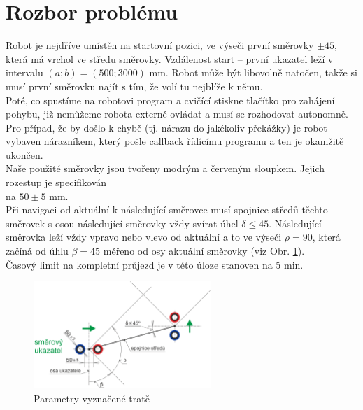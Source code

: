 \documentclass{article}
\begin{document}
\section{Rozbor problému}
Robot je nejdříve umístěn na startovní pozici, ve výseči první směrovky $\pm 45$\degree{}, která má vrchol ve středu směrovky. Vzdálenost start – první ukazatel leží v intervalu $(a; b) = (500; 3000)$ mm. Robot může být libovolně natočen, takže si musí první směrovku najít s tím, že volí tu nejblíže k němu.\\
Poté, co spustíme na robotovi program a cvičící stiskne tlačítko pro zahájení pohybu, již nemůžeme robota externě ovládat a musí se rozhodovat autonomně.\\
Pro případ, že by došlo k chybě (tj. nárazu do jakékoliv překážky) je robot vybaven nárazníkem, který pošle callback řídícímu programu a ten je okamžitě ukončen.\\
Naše použité směrovky jsou tvořeny modrým a červeným sloupkem. Jejich rozestup je specifikován\\na $50\pm5$ mm.\\
Při navigaci od aktuální k následující směrovce musí spojnice středů těchto směrovek s osou následující směrovky vždy svírat úhel $\delta \leq 45$\degree{}. Následující směrovka leží vždy vpravo nebo vlevo od aktuální a to ve výseči $\rho=90$\degree{}, která začíná od úhlu $\beta=45$\degree{} měřeno od osy aktuální směrovky (viz Obr. \ref{fig:1}).\\
Časový limit na kompletní průjezd je v této úloze stanoven na 5 min.
	\begin{figure}[h!]
        		\centering
        		\setlength{\unitlength}{1cm}
    		\includegraphics[width=0.6\textwidth]{vykres_ukazatel_jizda.png}
        		\caption{Parametry vyznačené tratě}
		\label{fig:1}
    	\end{figure}
\end{document}
